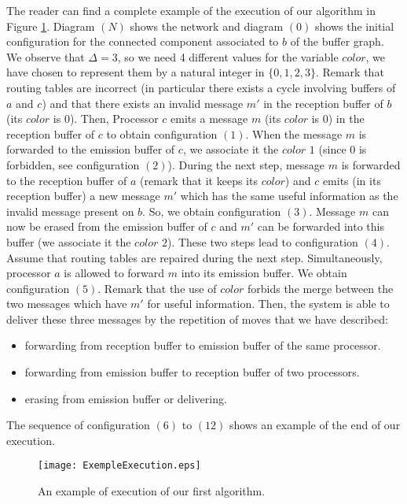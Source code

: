 \documentclass[11pt]{article}
\begin{document}
The reader can find a complete example of the execution of our algorithm in Figure \ref{fig:ExempleExecution}. Diagram $(N)$ shows the network and diagram $(0)$ shows the initial configuration for the connected component associated to $b$ of the buffer graph. We observe that $\Delta=3$, so we need 4 different values for the variable $color$, we have chosen to represent them by a natural integer in $\{0,1,2,3\}$.  Remark that routing tables are incorrect (in particular there exists a cycle involving buffers of $a$ and $c$) and that there exists an invalid message $m'$ in the reception buffer of $b$ (its $color$ is $0$). Then, Processor $c$ emits a message $m$ (its $color$ is $0$) in the reception buffer of $c$ to obtain configuration $(1)$. When the message $m$ is forwarded to the emission buffer of $c$, we associate it the $color$ $1$ (since $0$ is forbidden, see configuration $(2)$). During the next step, message $m$ is forwarded to the reception buffer of $a$ (remark that it keeps its $color$) and $c$ emits (in its reception buffer) a new message $m'$ which has the same useful information as the invalid message present on $b$. So, we obtain configuration $(3)$. Message $m$ can now be erased from the emission buffer of $c$ and $m'$ can be forwarded into this buffer (we associate it the $color$ $2$). These two steps lead to configuration $(4)$. Assume that routing tables are repaired during the next step. Simultaneously, processor $a$ is allowed to forward $m$ into its emission buffer. We obtain configuration $(5)$. Remark that the use of $color$ forbids the merge between the two messages which have $m'$ for useful information. Then, the system is able to deliver these three messages by the repetition of moves that we have described: 
\begin{itemize}
\item forwarding from reception buffer to emission buffer of the same processor.
\item forwarding from emission buffer to reception buffer of two processors.
\item erasing from emission buffer or delivering.
\end{itemize}
The sequence of configuration $(6)$ to $(12)$ shows an example of the end of our execution.

\begin{figure}
\noindent \begin{centering}
\texttt{[image: ExempleExecution.eps]}
\par\end{centering}
\caption{\label{fig:ExempleExecution}An example of execution of our first algorithm.}
\end{figure}
\end{document}
